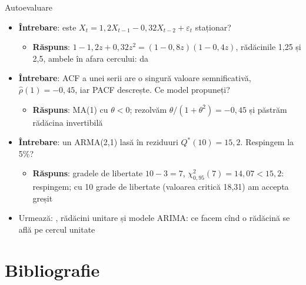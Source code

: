 \begin{frame}{Autoevaluare}
\itemsize{\small}
\begin{itemize}
    \item \textbf{Întrebare}: este $X_t = 1{,}2X_{t-1} - 0{,}32X_{t-2} + \varepsilon_t$ staționar?
    \begin{itemize}
        \item \textbf{Răspuns}: $1 - 1{,}2z + 0{,}32z^2 = (1 - 0{,}8z)(1 - 0{,}4z)$, rădăcinile 1,25 și 2,5, ambele în afara cercului: da
    \end{itemize}
    \item \textbf{Întrebare}: ACF a unei serii are o singură valoare semnificativă, $\hat\rho(1) = -0{,}45$, iar PACF descrește. Ce model propuneți?
    \begin{itemize}
        \item \textbf{Răspuns}: MA(1) cu $\theta < 0$; rezolvăm $\theta/(1 + \theta^2) = -0{,}45$ și păstrăm rădăcina invertibilă
    \end{itemize}
    \item \textbf{Întrebare}: un ARMA(2,1) lasă în reziduuri $Q^*(10) = 15{,}2$. Respingem la 5\%?
    \begin{itemize}
        \item \textbf{Răspuns}: gradele de libertate $10 - 3 = 7$, $\chi^2_{0{,}95}(7) = 14{,}07 < 15{,}2$: respingem; cu 10 grade de libertate (valoarea critică 18,31) am accepta greșit
    \end{itemize}
    \item Urmează: , rădăcini unitare și modele ARIMA: ce facem cînd o rădăcină se află pe cercul unitate
\end{itemize}
\end{frame}


\section{Bibliografie}

